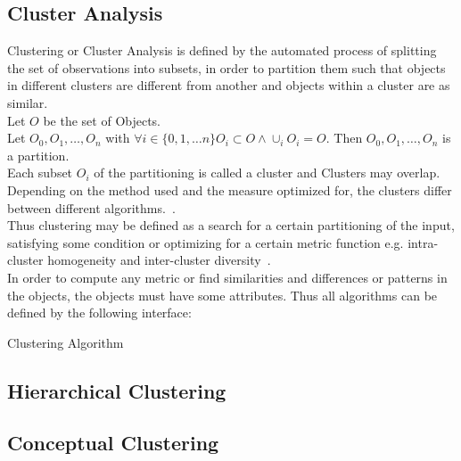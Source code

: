 \subsection{Cluster Analysis}
Clustering or Cluster Analysis is defined by the automated process of splitting the set of observations into subsets, in order to partition them such that objects in different clusters are different from another and objects within a cluster are as similar. \\
Let $O$ be the set of Objects. \\
Let $O_0, O_1, \dots, O_n$ with $\forall i \in \{0, 1, \dots n\} O_i \subset O \wedge \cup_i O_i = O$. Then $O_0, O_1, \dots, O_n$ is a partition. \\
Each subset $O_i$ of the partitioning is called a cluster and Clusters may overlap.
Depending on the method used and the measure optimized for, the clusters differ between different algorithms.~\cite{han2011data}. \\
Thus clustering may be defined as a search for a certain partitioning of the input, satisfying some condition or optimizing for a certain metric function e.g. intra-cluster homogeneity and inter-cluster diversity~\cite{Fisher1987}. \\
In order to compute any metric or find similarities and differences or patterns in the objects, the objects must have some attributes.
Thus all algorithms can be defined by the following interface:
\begin{algorithm}
\caption{Clustering Algorithm}\label{clustering}
\end{algorithm}

\subsection{Hierarchical Clustering}

\subsection{Conceptual Clustering}

